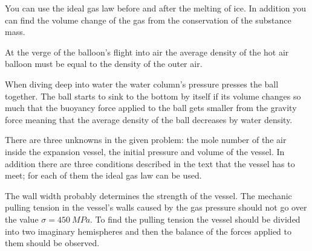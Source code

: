 \documentclass[11pt]{article}
\begin{document}

\hinteng
You can use the ideal gas law before and after the melting of ice. In addition you can find the volume change of the gas from the conservation of the substance mass.
\probend
\bigskip



\bigskip


\hinteng
At the verge of the balloon's flight into air the average density of the hot air balloon must be equal to the density of the outer air.
\probend
\bigskip


\hinteng
When diving deep into water the water column's pressure presses the ball together. The ball starts to sink to the bottom by itself if its volume changes so much that the buoyancy force applied to the ball gets smaller from the gravity force meaning that the average density of the ball decreases by water density.
\probend
\bigskip


\hinteng
There are three unknowns in the given problem: the mole number of the air inside the expansion vessel, the initial pressure and volume of the vessel. In addition there are three conditions described in the text that the vessel has to meet; for each of them the ideal gas law can be used.
\probend
\bigskip


\hinteng
The wall width probably determines the strength of the vessel. The mechanic pulling tension in the vessel's walls caused by the gas pressure should not go over the value $\sigma=\SI{450}{MPa}$. To find the pulling tension the vessel should be divided into two imaginary hemispheres and then the balance of the forces applied to them should be observed.
\probend
\bigskip
\end{document}
